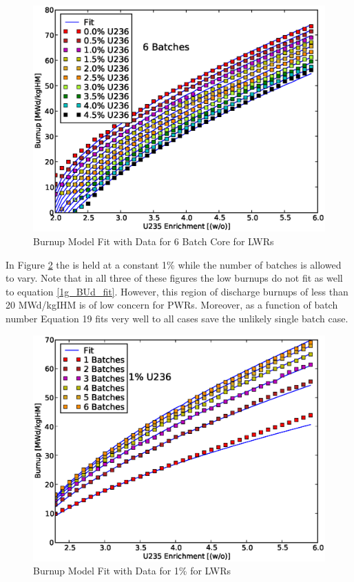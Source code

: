\begin{figure}[htbp]
\caption{Burnup Model Fit with Data for 6 Batch Core for LWRs}
\label{1g_fig15}
\begin{center}
\includegraphics[scale=0.5]{one_group_method/figs/Fig15.eps}
\end{center}
\end{figure}

In Figure \ref{1g_fig16} the  is held at a constant 1\% while the number of batches is 
allowed to vary.  Note that in all three of these figures the low burnups do not fit as well to 
equation \ref{1g_BUd_fit}. However, this region of discharge burnups of less than 20 MWd/kgIHM is 
of low concern for PWRs.   Moreover, as a function of batch number Equation 19 fits very well to 
all cases save the unlikely single batch case.  

\begin{figure}[htbp]
\caption{Burnup Model Fit with Data for 1\%  for LWRs}
\label{1g_fig16}
\begin{center}
\includegraphics[scale=0.5]{one_group_method/figs/Fig16.eps}
\end{center}
\end{figure}


